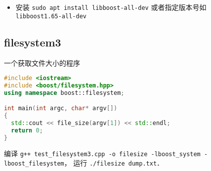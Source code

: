 
\begin{itemize}
\item 安装 \verb|sudo apt install libboost-all-dev| 或者指定版本号如 \verb|libboost1.65-all-dev|
\end{itemize}

\subsection{filesystem3}
一个获取文件大小的程序
\begin{lstlisting}[language=cpp]
#include <iostream>
#include <boost/filesystem.hpp>
using namespace boost::filesystem;

int main(int argc, char* argv[])
{
  std::cout << file_size(argv[1]) << std::endl;
  return 0;
}
\end{lstlisting}

编译 \verb|g++ test_filesystem3.cpp -o filesize -lboost_system -lboost_filesystem|， 运行 \verb|./filesize dump.txt|．